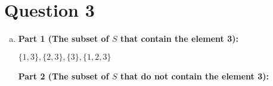 \documentclass[12pt]{article}
\begin{document}
\section*{Question 3}
\begin{enumerate}[a.]
    \item

    \textbf{Part 1 (The subset of $S$ that contain the element 3):}

    $\{1,3\}, \{2,3\}, \{3\}, \{1,2,3\}$

    \bigskip

    \textbf{Part 2 (The subset of $S$ that do not contain the element 3):}


\end{enumerate}
\end{document}
